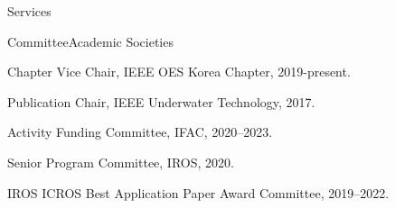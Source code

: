 \begin{rSection}{Services}

\begin{rSubsection}{Committee}{}{Academic Societies}{}


  \item Chapter Vice Chair, IEEE OES Korea Chapter, 2019-present.


  \item Publication Chair, IEEE Underwater Technology, 2017.

  \item Activity Funding Committee, IFAC, 2020--2023.
  \item Senior Program Committee, IROS, 2020.
  \item IROS ICROS Best Application Paper Award Committee, 2019--2022.
\end{rSubsection}


%
%


\end{rSection}
